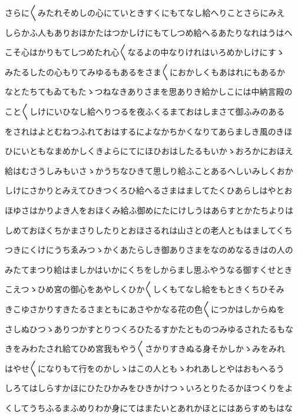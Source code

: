 \documentclass[a4paper,11pt,landscape]{ltjtarticle}
\begin{document}
\par\medskip
さらに〱みたれそめしの心にていときすくにもてなし給へりことさらにみえ
\par\medskip
しらかふ人もありおほかたはつかしけにもてしつめ給へるあたりなれはうはへ
\par\medskip
こそ心はかりもてしつめたれ心〱なるよの中なりけれはいろめかしけにすゝ
\par\medskip
みたるしたの心もりてみゆるもあるをさま〱におかしくもあはれにもあるか
\par\medskip
なとたちてもゐてもたゝつねなきありさまを思ありき給かしこには中納言殿の
\par\medskip
こと〱しけにいひなし給へりつるを夜ふくるまておはしまさて御ふみのある
\par\medskip
をされはよとむねつふれておはするによなかちかくなりてあらましき風のきほ
\par\medskip
ひにいともなまめかしくきよらにてにほひおはしたるもいかゝおろかにおほえ
\par\medskip
給はむさうしみもいさゝかうちなひきて思しり給ふことあるへしいみしくおか
\par\medskip
しけにさかりとみえてひきつくろひ給へるさまはましてたくひあらしはやとお
\par\medskip
ほゆさはかりよき人をおほくみ給ふ御めにたにけしうはあらすとかたちよりは
\par\medskip
しめておほくちかまさりしたりとおほさるれは山さとの老人ともはましてくち
\par\medskip
つきにくけにうちゑみつゝかくあたらしき御ありさまをなのめなるきはの人の
\par\medskip
みたてまつり給はましかはいかにくちをしからまし思ふやうなる御すくせとき
\par\medskip
こえつゝひめ宮の御心をあやしくひか〱しくもてなし給をもときくちひそみ
\par\medskip
きこゆさかりすきたるさまともにあさやかなる花の色〱につかはしからぬを
\par\medskip
さしぬひつゝありつかすとりつくろひたるすかたとものつみゆるされたるもな
\par\medskip
きをみわたされ給てひめ宮我もやう〱さかりすきぬる身そかしかゝみをみれ
\par\medskip
はやせ〱になりもて行をのかしゝはこの人ともゝわれあしとやはおもへるう
\par\medskip
しろてはしらすかほにひたひかみをひきかけつゝいろとりたるかほつくりをよ
\par\medskip
くしてうちふるまふめりわか身にてはまたいとあれかほとにはあらすめもはな
\par\medskip
\end{document}
